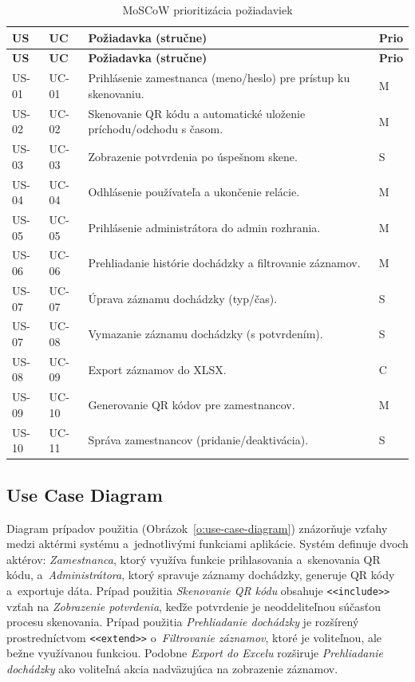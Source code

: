 \renewcommand{\arraystretch}{1.12}
\setlength{\tabcolsep}{3pt}
\footnotesize
\begin{longtable}{|p{1.3cm}|p{1.3cm}|p{9.0cm}|p{1.0cm}|}
\caption{MoSCoW prioritizácia požiadaviek}\label{t:moscow}\\
\hline
\textbf{US} & \textbf{UC} & \textbf{Požiadavka (stručne)} & \textbf{Prio} \\
\hline
\endfirsthead
\hline
\textbf{US} & \textbf{UC} & \textbf{Požiadavka (stručne)} & \textbf{Prio} \\
\hline
\endhead
US-01 & UC-01 & Prihlásenie zamestnanca (meno/heslo) pre prístup ku skenovaniu. & M \\
\hline
US-02 & UC-02 & Skenovanie QR kódu a automatické uloženie príchodu/odchodu s časom. & M \\
\hline
US-03 & UC-03 & Zobrazenie potvrdenia po úspešnom skene. & S \\
\hline
US-04 & UC-04 & Odhlásenie používateľa a ukončenie relácie. & M \\
\hline
US-05 & UC-05 & Prihlásenie administrátora do admin rozhrania. & M \\
\hline
US-06 & UC-06 & Prehliadanie histórie dochádzky a filtrovanie záznamov. & M \\
\hline
US-07 & UC-07 & Úprava záznamu dochádzky (typ/čas). & S \\
\hline
US-07 & UC-08 & Vymazanie záznamu dochádzky (s potvrdením). & S \\
\hline
US-08 & UC-09 & Export záznamov do XLSX. & C \\
\hline
US-09 & UC-10 & Generovanie QR kódov pre zamestnancov. & M \\
\hline
US-10 & UC-11 & Správa zamestnancov (pridanie/deaktivácia). & S \\
\hline
\end{longtable}

\subsection{Use Case Diagram}

Diagram prípadov použitia (Obrázok~\ref{o:use-case-diagram}) znázorňuje vzťahy medzi
aktérmi systému a~jednotlivými funkciami aplikácie. Systém definuje dvoch aktérov:
\textit{Zamestnanca}, ktorý využíva funkcie prihlasovania a~skenovania QR kódu, a~\textit{Administrátora}, ktorý spravuje záznamy dochádzky, generuje QR kódy a~exportuje
dáta. Prípad použitia \textit{Skenovanie QR kódu} obsahuje \texttt{<<include>>} vzťah
na \textit{Zobrazenie potvrdenia}, keďže potvrdenie je neoddeliteľnou súčasťou
procesu skenovania. Prípad použitia \textit{Prehliadanie dochádzky} je rozšírený
prostredníctvom \texttt{<<extend>>} o~\textit{Filtrovanie záznamov}, ktoré je
voliteľnou, ale bežne využívanou funkciou. Podobne \textit{Export do Excelu} rozširuje
\textit{Prehliadanie dochádzky} ako voliteľná akcia nadväzujúca na zobrazenie záznamov.

